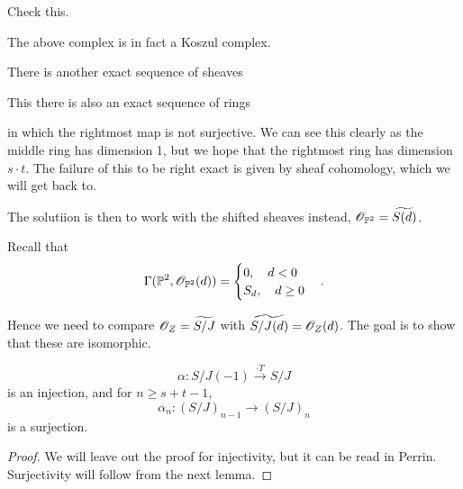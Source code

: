 \begin{problem}
Check this. 
\end{problem}
The above complex is in fact a Koszul complex. 

There is another exact sequence of sheaves
\begin{center}
\end{center}

This there is also an exact sequence of rings 
\begin{center}
\end{center}
in which the rightmost map is not surjective. We can see this clearly as the middle ring has dimension 1, but we hope that the rightmost ring has dimension $s\cdot t$. The failure of this to be right exact is given by sheaf cohomology, which we will get back to. 

The solutiion is then to work with the shifted sheaves instead, $\mathscr{O}_{\mathbb{P}^2} = \widetilde{S(d)}$. 

Recall that 
\begin{equation*}
\Gamma(\mathbb{P}^2, \mathscr{O}_{\mathbb{P}^2}(d)) = 
    \begin{cases}
        0, \quad d<0 \\
        S_d, \quad d\geq 0
    \end{cases}.
\end{equation*}

Hence we need to compare $\mathscr{O}_Z=\widetilde{S/J}$ with $\widetilde{S/J(d)}=\mathscr{O}_Z(d)$. The goal is to show that these are isomorphic. 

\begin{proposition}
\begin{equation*}
    \alpha\colon S/J(-1)\overset{\cdot T}\longrightarrow S/J
\end{equation*}
is an injection, and for $n\geq s+t-1$, 
\begin{equation*}
    \alpha_n\colon (S/J)_{n-1}\longrightarrow (S/J)_n
\end{equation*}
is a surjection. 
\end{proposition}
\begin{proof}
We will leave out the proof for injectivity, but it can be read in Perrin. Surjectivity will follow from the next lemma. 
\end{proof}

